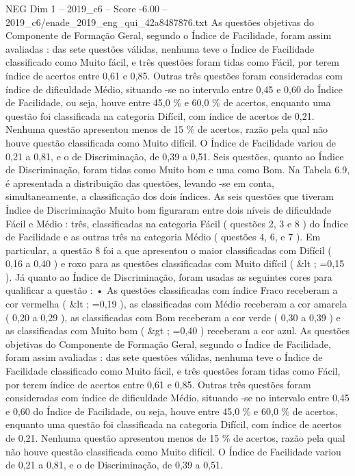 \begin{textsample}{NEG Dim 1 – 2019\_c6 – Score -6.00 – 2019\_c6/enade\_2019\_eng\_qui\_42a8487876.txt}
As questões objetivas do Componente de Formação Geral, segundo o Índice de Facilidade, foram assim avaliadas : das sete questões válidas, nenhuma teve o Índice de Facilidade classificado como Muito fácil, e três questões foram tidas como Fácil, por terem índice de acertos entre 0,61 e 0,85.
Outras três questões foram consideradas com índice de dificuldade Médio, situando -se no intervalo entre 0,45 e 0,60 do Índice de Facilidade, ou seja, houve entre 45,0 \% e 60,0 \% de acertos, enquanto uma questão foi classificada na categoria Difícil, com índice de acertos de 0,21.
Nenhuma questão apresentou menos de 15 \% de acertos, razão pela qual não houve questão classificada como Muito difícil.
O Índice de Facilidade variou de 0,21 a 0,81, e o de Discriminação, de 0,39 a 0,51.
Seis questões, quanto ao Índice de Discriminação, foram tidas como Muito bom e uma como Bom.
Na Tabela 6.9, é apresentada a distribuição das questões, levando -se em conta, simultaneamente, a classificação dos dois índices.
As seis questões que tiveram Índice de Discriminação Muito bom figuraram entre dois níveis de dificuldade Fácil e Médio : três, classificadas na categoria Fácil ( questões 2, 3 e 8 ) do Índice de Facilidade e as outras três na categoria Médio ( questões 4, 6, e 7 ).
Em particular, a questão 8 foi a que apresentou o maior classificadas com Difícil ( 0,16 a 0,40 ) e roxo para as questões classificadas com Muito difícil ( \&lt ; =0,15 ).
Já quanto ao Índice de Discriminação, foram usadas as seguintes cores para qualificar a questão : • As questões classificadas com índice Fraco receberam a cor vermelha ( \&lt ; =0,19 ), as classificadas com Médio receberam a cor amarela ( 0,20 a 0,29 ), as classificadas com Bom receberam a cor verde ( 0,30 a 0,39 ) e as classificadas com Muito bom ( \&gt ; =0,40 ) receberam a cor azul.
As questões objetivas do Componente de Formação Geral, segundo o Índice de Facilidade, foram assim avaliadas : das sete questões válidas, nenhuma teve o Índice de Facilidade classificado como Muito fácil, e três questões foram tidas como Fácil, por terem índice de acertos entre 0,61 e 0,85.
Outras três questões foram consideradas com índice de dificuldade Médio, situando -se no intervalo entre 0,45 e 0,60 do Índice de Facilidade, ou seja, houve entre 45,0 \% e 60,0 \% de acertos, enquanto uma questão foi classificada na categoria Difícil, com índice de acertos de 0,21.
Nenhuma questão apresentou menos de 15 \% de acertos, razão pela qual não houve questão classificada como Muito difícil.
O Índice de Facilidade variou de 0,21 a 0,81, e o de Discriminação, de 0,39 a 0,51.

\end{textsample}
